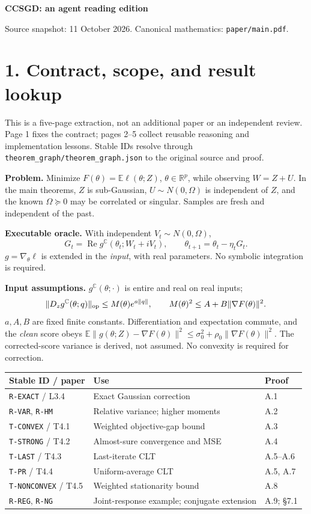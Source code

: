 \documentclass[11pt]{article}
\newcommand{\E}{\mathbb E}\newcommand{\R}{\mathbb R}\newcommand{\C}{\mathbb C}
\newcommand{\norm}[1]{\lVert#1\rVert}
\newcommand{\ID}[1]{\texttt{#1}}
\begin{document}
{\LARGE\bfseries CCSGD: an agent reading edition}\par
{\small Source snapshot: 11 October 2026. Canonical mathematics: \texttt{paper/main.pdf}.}

\section*{1. Contract, scope, and result lookup}
This is a five-page extraction, not an additional paper or an independent review.
Page 1 fixes the contract; pages 2--5 collect reusable reasoning and implementation lessons.
Stable IDs resolve through \texttt{theorem\_graph/theorem\_graph.json} to the original source and proof.

\textbf{Problem.} Minimize $F(\theta)=\E\ell(\theta;Z)$, $\theta\in\R^p$, while observing
$W=Z+U$. In the main theorems, $Z$ is sub-Gaussian, $U\sim N(0,\Omega)$ is independent of $Z$, and the known $\Omega\succeq0$ may be correlated or singular. Samples are fresh and independent of the past.

\textbf{Executable oracle.} With independent $V_t\sim N(0,\Omega)$,
\[
G_t=\operatorname{Re}g^{\C}(\theta_t;W_t+iV_t),\qquad
\theta_{t+1}=\theta_t-\eta_tG_t.
\]
$g=\nabla_\theta\ell$ is extended in the \emph{input}, with real parameters. No symbolic integration is required.

\textbf{Input assumptions.} $g^{\C}(\theta;\cdot)$ is entire and real on real inputs;
\[
\norm{D_zg^{\C}(\theta;q)}_{\rm op}\le M(\theta)e^{a\norm q},\qquad
M(\theta)^2\le A+B\norm{\nabla F(\theta)}^2.
\]
$a,A,B$ are fixed finite constants. Differentiation and expectation commute, and the \emph{clean} score obeys
$\E\norm{g(\theta;Z)-\nabla F(\theta)}^2\le\sigma_0^2+\rho_0\norm{\nabla F(\theta)}^2$.
The corrected-score variance is derived, not assumed. No convexity is required for correction.

\small
\begin{tabular}{p{.21\linewidth}p{.42\linewidth}p{.28\linewidth}}
\toprule Stable ID / paper & Use & Proof \\\midrule
\ID{R-EXACT} / L3.4 & Exact Gaussian correction & A.1 \\
\ID{R-VAR}, \ID{R-HM} & Relative variance; higher moments & A.2 \\
\ID{T-CONVEX} / T4.1 & Weighted objective-gap bound & A.3 \\
\ID{T-STRONG} / T4.2 & Almost-sure convergence and MSE & A.4 \\
\ID{T-LAST} / T4.3 & Last-iterate CLT & A.5--A.6 \\
\ID{T-PR} / T4.4 & Uniform-average CLT & A.5, A.7 \\
\ID{T-NONCONVEX} / T4.5 & Weighted stationarity bound & A.8 \\
\ID{R-REG}, \ID{R-NG} & Joint-response example; conjugate extension & A.9; \S7.1 \\
\bottomrule
\end{tabular}
\normalsize
\end{document}
